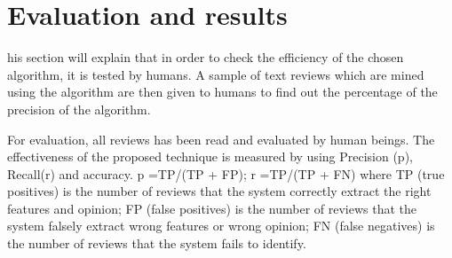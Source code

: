%
%


\let\textcircled=\pgftextcircled
\chapter{Evaluation and results}
\label{chap:dis}
his section will explain that in order to check the efficiency of the chosen algorithm, it is tested by humans. A sample of text reviews which are mined using the algorithm are then given to humans to find out the percentage of the precision of the algorithm. 

For evaluation, all reviews has been read and evaluated by human beings. The effectiveness of the proposed technique is measured by using Precision (p), Recall(r) and accuracy. 
p =TP/(TP + FP); r =TP/(TP + FN)
where TP (true positives) is the number of reviews that the system correctly extract the right features and opinion; FP (false positives) is the number of reviews that the system falsely extract wrong features or wrong opinion; FN (false negatives) is the number of reviews that the system fails to identify. \cite{yaakub2012integration}